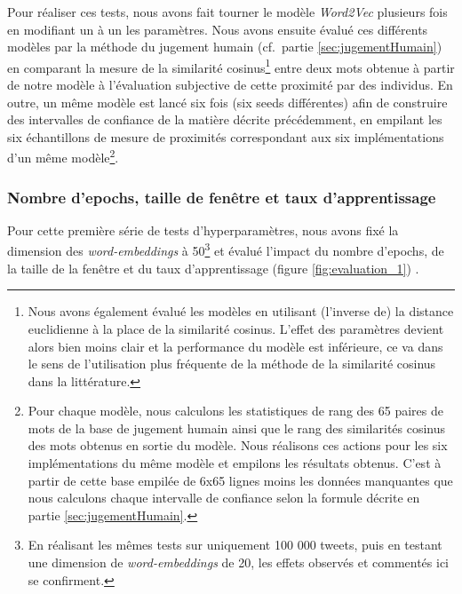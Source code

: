 \documentclass[11pt,french,french]{article}
\let\rmarkdownfootnote\footnote%
\def\footnote{\protect\rmarkdownfootnote}
\begin{document}
Pour réaliser ces tests, nous avons fait tourner le modèle
\emph{Word2Vec} plusieurs fois en modifiant un à un les paramètres. Nous
avons ensuite évalué ces différents modèles par la méthode du
\og jugement humain \fg{} (cf.~partie \ref{sec:jugementHumain}) en
comparant la mesure de la similarité cosinus\footnote{Nous avons
  également évalué les modèles en utilisant (l'inverse de) la distance
  euclidienne à la place de la similarité cosinus. L'effet des
  paramètres devient alors bien moins clair et la performance du modèle
  est inférieure, ce va dans le sens de l'utilisation plus fréquente de
  la méthode de la similarité cosinus dans la littérature.} entre deux
mots obtenue à partir de notre modèle à l'évaluation subjective de cette
proximité par des individus. En outre, un même modèle est lancé six fois
(six \og seeds \fg{} différentes) afin de construire des intervalles de
confiance de la matière décrite précédemment, en empilant les six
échantillons de mesure de proximités correspondant aux six
implémentations d'un même modèle\footnote{Pour chaque modèle, nous
  calculons les statistiques de rang des 65 paires de mots de la base de
  jugement humain ainsi que le rang des similarités cosinus des mots
  obtenus en sortie du modèle. Nous réalisons ces actions pour les six
  implémentations du même modèle et empilons les résultats obtenus.
  C'est à partir de cette base empilée de 6x65 lignes moins les données
  manquantes que nous calculons chaque intervalle de confiance selon la
  formule décrite en partie \ref{sec:jugementHumain}.}.

\subsubsection{Nombre d'epochs, taille de fenêtre et taux
d'apprentissage}\label{nombre-depochs-taille-de-fenuxeatre-et-taux-dapprentissage}

Pour cette première série de tests d'hyperparamètres, nous avons fixé la
dimension des \emph{word-embeddings} à 50\footnote{En réalisant les
  mêmes tests sur uniquement 100 000 tweets, puis en testant une
  dimension de \emph{word-embeddings} de 20, les effets observés et
  commentés ici se confirment.} et évalué l'impact du nombre d'epochs,
de la taille de la fenêtre et du taux d'apprentissage (figure
\ref{fig:evaluation_1}) .
\end{document}
